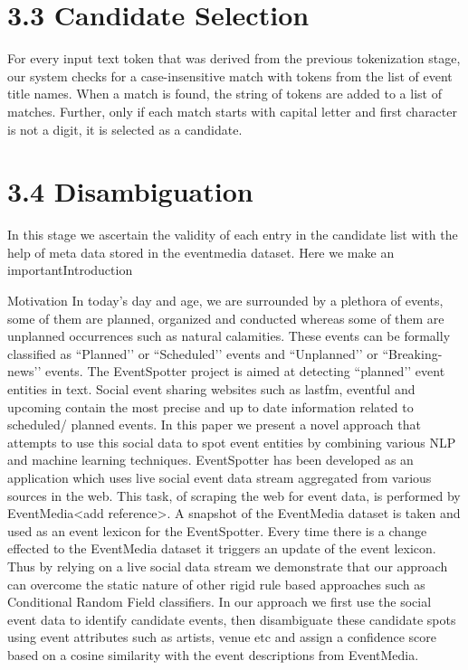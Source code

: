 \documentclass[a4paper,11pt]{report}
\begin{document}

\section*{3.3 Candidate Selection}

For every input text token that was derived from the previous tokenization stage, our system checks for a case-insensitive match with tokens from the list of event title names. When a match is found, the string of tokens are added to a list of matches. Further, only if each match starts with capital letter and first character is not a digit, it is selected as a candidate.

\section*{3.4 Disambiguation}
In this stage we ascertain the validity of each entry in the candidate list with the help of meta data stored in the eventmedia dataset. Here we make an importantIntroduction

Motivation
In today’s day and age, we are surrounded by a plethora of events, some of them are planned, organized and conducted whereas some of them are unplanned occurrences such as natural calamities. These events can be formally classified as ``Planned’’ or ``Scheduled’’ events and ``Unplanned’’ or ``Breaking-news’’ events. The EventSpotter project is aimed at detecting ``planned’’ event entities in text. Social event sharing websites such as lastfm, eventful and upcoming contain the most precise and up to date information related to scheduled/ planned events. In this paper we present a novel approach that attempts to use this social data to spot event entities by combining various NLP and machine learning techniques. EventSpotter has been developed as an application which uses live social event data stream aggregated from various sources in the web. This task, of scraping the web for event data, is performed by EventMedia<add reference>. A snapshot of the EventMedia dataset is taken and used as an event lexicon for the EventSpotter. Every time there is a change effected to the EventMedia dataset it triggers an update of the event lexicon. Thus by relying on a live social data stream we demonstrate that our approach can overcome the static nature of other rigid rule based approaches such as Conditional Random Field classifiers. In our approach we first use the social event data to identify candidate events, then disambiguate these candidate spots using event attributes such as artists, venue etc and assign a confidence score based on a cosine similarity with the event descriptions from EventMedia. 
\end{document}
